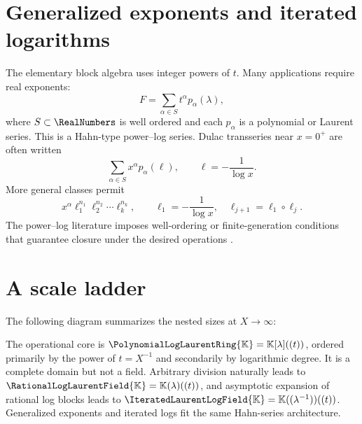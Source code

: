 \documentclass[11pt,openany]{book}
\theoremstyle{definition}
\theoremstyle{plain}
\theoremstyle{remark}
\newcommand{\K}{\mathbb{K}}
\newcommand{\Plog}{\PolynomialLogLaurentRing{\K}}
\newcommand{\Rlog}{\RationalLogLaurentField{\K}}
\newcommand{\Hlog}{\IteratedLaurentLogField{\K}}
\newcommand{\succdom}{\succ}
\begin{document}
\section{Generalized exponents and iterated logarithms}
The elementary block algebra uses integer powers of \(t\). Many applications require real exponents:
\begin{equation}\label{eq:general-powerlog}
 F=\sum_{\alpha\in S}t^\alpha p_\alpha(\lambda),
\end{equation}
where \(S\subset\RealNumbers\) is well ordered and each \(p_\alpha\) is a polynomial or Laurent series. This is a Hahn-type power--log series. Dulac transseries near \(x=0^+\) are often written
\[
 \sum_{\alpha\in S}x^\alpha p_\alpha(\ell),
 \qquad \ell=-\frac1{\log x}.
\]
More general classes permit
\[
 x^\alpha\ell_1^{n_1}\ell_2^{n_2}\cdots\ell_k^{n_k},
 \qquad
 \ell_1=-\frac1{\log x},\quad
 \ell_{j+1}=\ell_1\circ\ell_j.
\]
The power--log literature imposes well-ordering or finite-generation conditions that guarantee closure under the desired operations \cite{mardesic-normalforms,mardesic-length,resman-dulac,peran-logtransseries}.

\section{A scale ladder}
The following diagram summarizes the nested sizes at \(X\to\infty\):
\begin{center}
\end{center}

\begin{summarybox}
The operational core is \(\Plog=\K[\lambda]((t))\), ordered primarily by the power of \(t=X^{-1}\) and secondarily by logarithmic degree. It is a complete domain but not a field. Arbitrary division naturally leads to \(\Rlog=\K(\lambda)((t))\), and asymptotic expansion of rational log blocks leads to \(\Hlog=\K((\lambda^{-1}))((t))\). Generalized exponents and iterated logs fit the same Hahn-series architecture.
\end{summarybox}
\end{document}
